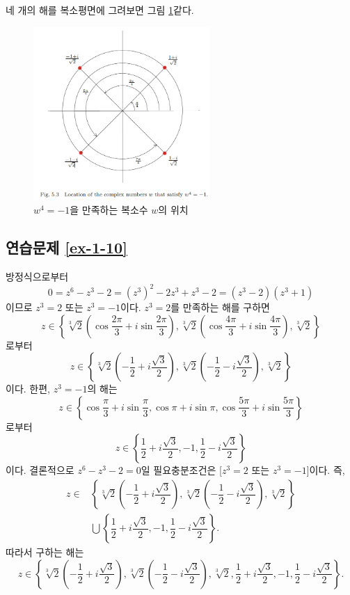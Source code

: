 네 개의 해를 복소평면에 그려보면 그림 \ref{fig-5-3}\과 같다.

\begin{figure}[h!]
\begin{center}
\includegraphics[width=0.6\textwidth]{./Solution/figs/fig-5-3}
\end{center}
\caption{$w^4=-1$을 만족하는 복소수 $w$의 위치}
\label{fig-5-3}
\end{figure}

\subsection*{연습문제 \ref{ex-1-10}}

방정식으로부터
\[
0=z^6 -z^3-2 = (z^3)^2 -2z^3 +z^3 -2 = (z^3-2)(z^3+1)
\]
이므로
$z^3=2$ 또는 $z^3=-1$이다.
$z^3=2$를 만족하는 해를 구하면
\[
z\in \left\{ \sqrt[3]{2} \left( \cos\dfrac{2\pi}3 + i\sin\dfrac{2\pi}3\right),
\sqrt[3]{2} \left( \cos\dfrac{4\pi}3 + i\sin\dfrac{4\pi}3\right), 
\sqrt[3]{2} \right\}
\]
로부터 
\[
z\in \left\{ \sqrt[3]{2} \left( - \dfrac12+ i\dfrac{\sqrt{3}}2\right),
\sqrt[3]{2} \left( -\dfrac12 - i\dfrac{\sqrt{3}}2\right), 
\sqrt[3]{2} \right\}
\]
이다. 한편, $z^3=-1$의 해는
\[
z\in\left\{ \cos\dfrac\pi3 + i\sin\dfrac\pi3, \cos\pi + i\sin\pi,
\cos\dfrac{5\pi}3 + i\sin\dfrac{5\pi}3 \right\}
\]
로부터 
\[
z\in \left\{ \dfrac12+ i\dfrac{\sqrt{3}}2, -1,
\dfrac12 - i\dfrac{\sqrt{3}}2 \right\}
\]
이다. 결론적으로
$z^6 - z^3-2=0$일 필요충분조건은 [$z^3=2$ 또는 $z^3=-1$]이다.
즉,
\begin{align*}
z\in & \left\{ \sqrt[3]{2} \left( - \dfrac12+ i\dfrac{\sqrt{3}}2\right),
\sqrt[3]{2} \left( -\dfrac12 - i\dfrac{\sqrt{3}}2\right), 
\sqrt[3]{2} \right\}\\
&\bigcup \left\{ \dfrac12+ i\dfrac{\sqrt{3}}2, -1,
\dfrac12 - i\dfrac{\sqrt{3}}2 \right\}.
\end{align*}
따라서 구하는 해는
\[
z\in \left\{ \sqrt[3]{2} \left( - \dfrac12+ i\dfrac{\sqrt{3}}2\right),
\sqrt[3]{2} \left( -\dfrac12 - i\dfrac{\sqrt{3}}2\right), 
\sqrt[3]{2},
\dfrac12+ i\dfrac{\sqrt{3}}2, -1,
\dfrac12 - i\dfrac{\sqrt{3}}2 \right\}.
\]

